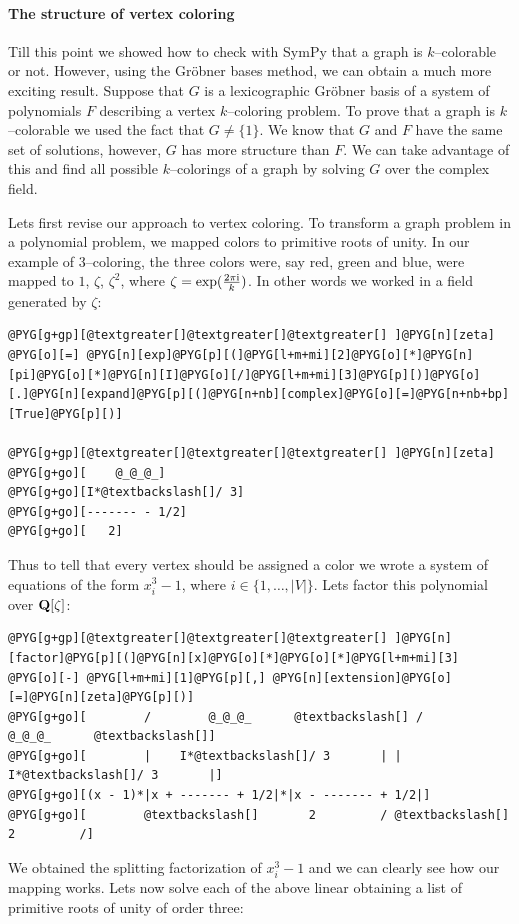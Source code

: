\paragraph{The structure of vertex coloring}

Till this point we showed how to check with SymPy that a graph is $k$--colorable or not. However, using
the Gröbner bases method, we can obtain a much more exciting result. Suppose that $G$ is a lexicographic
Gröbner basis of a system of polynomials $F$ describing a vertex $k$--coloring problem. To prove
that a graph is $k$--colorable we used the fact that $G \not= \{1\}$. We know that $G$ and $F$ have
the same set of solutions, however, $G$ has more structure than $F$. We can take advantage of this
and find all possible $k$--colorings of a graph by solving $G$ over the complex field.

Lets first revise our approach to vertex coloring. To transform a graph problem in a polynomial problem,
we mapped colors to primitive roots of unity. In our example of $3$--coloring, the three colors were, say
red, green and blue, were mapped to $1$, $\zeta$, $\zeta^2$, where $\zeta = \exp(\frac{2\pi\mathrm{i}}{k})$. In
other words we worked in a field generated by $\zeta$:

\begin{Verbatim}[commandchars=@\[\]]
@PYG[g+gp][@textgreater[]@textgreater[]@textgreater[] ]@PYG[n][zeta] @PYG[o][=] @PYG[n][exp]@PYG[p][(]@PYG[l+m+mi][2]@PYG[o][*]@PYG[n][pi]@PYG[o][*]@PYG[n][I]@PYG[o][/]@PYG[l+m+mi][3]@PYG[p][)]@PYG[o][.]@PYG[n][expand]@PYG[p][(]@PYG[n+nb][complex]@PYG[o][=]@PYG[n+nb+bp][True]@PYG[p][)]

@PYG[g+gp][@textgreater[]@textgreater[]@textgreater[] ]@PYG[n][zeta]
@PYG[g+go][    @_@_@_]
@PYG[g+go][I*@textbackslash[]/ 3]
@PYG[g+go][------- - 1/2]
@PYG[g+go][   2]
\end{Verbatim}
\noindent
Thus to tell that every vertex should be assigned a color we wrote a system of equations of the form
$x_i^3 - 1$, where $i \in \{1, \ldots, |V|\}$. Lets factor this polynomial over $\mathbf{Q}[\zeta]$:

\begin{Verbatim}[commandchars=@\[\]]
@PYG[g+gp][@textgreater[]@textgreater[]@textgreater[] ]@PYG[n][factor]@PYG[p][(]@PYG[n][x]@PYG[o][*]@PYG[o][*]@PYG[l+m+mi][3] @PYG[o][-] @PYG[l+m+mi][1]@PYG[p][,] @PYG[n][extension]@PYG[o][=]@PYG[n][zeta]@PYG[p][)]
@PYG[g+go][        /        @_@_@_      @textbackslash[] /        @_@_@_      @textbackslash[]]
@PYG[g+go][        |    I*@textbackslash[]/ 3       | |    I*@textbackslash[]/ 3       |]
@PYG[g+go][(x - 1)*|x + ------- + 1/2|*|x - ------- + 1/2|]
@PYG[g+go][        @textbackslash[]       2         / @textbackslash[]       2         /]
\end{Verbatim}
\noindent
We obtained the splitting factorization of $x_i^3 - 1$ and we can clearly see how our mapping works.
Lets now solve each of the above linear obtaining a list of primitive roots of unity of order three:

